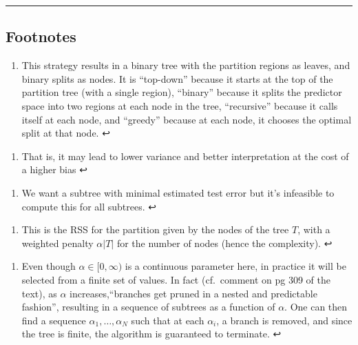 \documentclass[11pt]{article}
\providecommand{\tightlist}{%
      \setlength{\itemsep}{0pt}\setlength{\parskip}{0pt}}
\begin{document}
    \begin{center}\rule{0.5\linewidth}{\linethickness}\end{center}

\hypertarget{footnotes}{%
\subsection{Footnotes}\label{footnotes}}

    \hypertarget{foot64}{}
\begin{enumerate}
\def\labelenumi{\arabic{enumi}.}
\setcounter{enumi}{63}
\tightlist
\item
  This strategy results in a binary tree with the partition regions as
  leaves, and binary splits as nodes. It is ``top-down'' because it
  starts at the top of the partition tree (with a single region),
  ``binary'' because it splits the predictor space into two regions at
  each node in the tree, ``recursive'' because it calls itself at each
  node, and ``greedy'' because at each node, it chooses the optimal
  split at that node. ↩
\end{enumerate}

\hypertarget{foot65}{}
\begin{enumerate}
\def\labelenumi{\arabic{enumi}.}
\setcounter{enumi}{64}
\tightlist
\item
  That is, it may lead to lower variance and better interpretation at
  the cost of a higher bias ↩
\end{enumerate}

\hypertarget{foot66}{}
\begin{enumerate}
\def\labelenumi{\arabic{enumi}.}
\setcounter{enumi}{65}
\tightlist
\item
  We want a subtree with minimal estimated test error but it's
  infeasible to compute this for all subtrees. ↩
\end{enumerate}

\hypertarget{foot67}{}
\begin{enumerate}
\def\labelenumi{\arabic{enumi}.}
\setcounter{enumi}{66}
\tightlist
\item
  This is the RSS for the partition given by the nodes of the tree
  \(T\), with a weighted penalty \(\alpha|T|\) for the number of nodes
  (hence the complexity). ↩
\end{enumerate}

\hypertarget{foot68}{}
\begin{enumerate}
\def\labelenumi{\arabic{enumi}.}
\setcounter{enumi}{67}
\tightlist
\item
  Even though \(\alpha \in [0, \infty)\) is a continuous parameter here,
  in practice it will be selected from a finite set of values. In fact
  (cf.~comment on pg 309 of the text), as \(\alpha\)
  increases,``branches get pruned in a nested and predictable fashion'',
  resulting in a sequence of subtrees as a function of \(\alpha\). One
  can then find a sequence \(\alpha_1, \dots, \alpha_N\) such that at
  each \(\alpha_i\), a branch is removed, and since the tree is finite,
  the algorithm is guaranteed to terminate. ↩
\end{enumerate}
\end{document}
